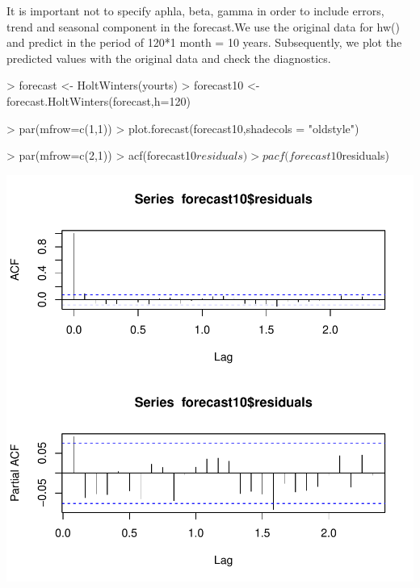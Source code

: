 \documentclass[11pt, a4paper]{article} %
\begin{document}
It is important not to specify aphla, beta, gamma in order to include errors, trend and seasonal component in the forecast.We use the original data for hw() and predict in the period of 120*1 month = 10 years. Subsequently, we plot the predicted values with the original data and check the diagnostics.  \\
\begin{Schunk}
\begin{Sinput}
> forecast <- HoltWinters(yourts)
> forecast10 <- forecast.HoltWinters(forecast,h=120)
\end{Sinput}
\end{Schunk}

\begin{Schunk}
\begin{Sinput}
> par(mfrow=c(1,1))
> plot.forecast(forecast10,shadecols = "oldstyle")
\end{Sinput}
\end{Schunk}


\begin{Schunk}
\begin{Sinput}
> par(mfrow=c(2,1))
> acf(forecast10$residuals)
> pacf(forecast10$residuals)
\end{Sinput}
\end{Schunk}
\includegraphics{alleselena-068}
\end{document}
